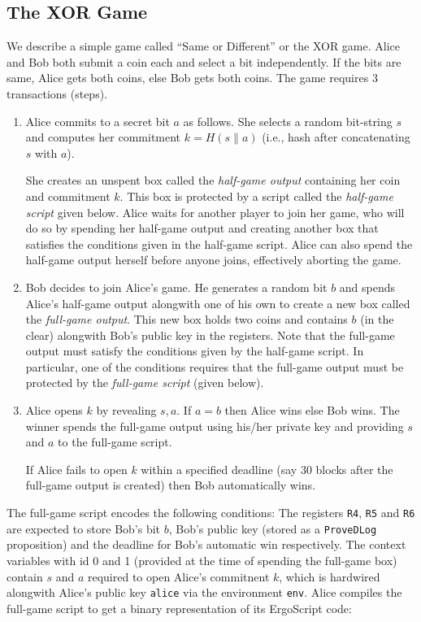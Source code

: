 \documentclass[11pt]{article}
\newcommand{\langname}{ErgoScript\xspace}
\begin{document}
\subsection{The XOR Game}

We describe a simple game called ``Same or Different'' or the XOR game. Alice and Bob both submit a coin each and select a bit independently. If the bits are same, Alice gets both coins, else Bob gets both coins. The game requires 3 transactions (steps). 
\begin{enumerate}
	\item Alice commits to a secret bit $a$ as follows. She selects a random bit-string $s$ and computes her commitment $k = H(s\|a)$ (i.e., hash after concatenating $s$ with $a$).
	
	She creates an unspent box called the {\em half-game output} containing her coin and commitment $k$. This box is protected by a script called the {\em half-game script}  given below. Alice waits for another player to join her game, who will do so by spending her half-game output and creating another box that satisfies the conditions given in the half-game script. Alice can also spend the half-game output herself before anyone joins, effectively aborting the game. 
	
	\item Bob decides to join Alice's game. He generates a random bit $b$ and spends Alice's half-game output alongwith one of his own to create a new box called the {\em full-game output}. This new box  holds two coins and contains $b$ (in the clear) alongwith Bob's public key in the registers. 
	Note that the full-game output must satisfy the conditions given by the half-game script. In particular, one of the conditions requires that the full-game output must be protected by the {\em full-game script} (given below).
	\item Alice opens $k$ by revealing $s, a$. If $a = b$ then Alice wins else Bob wins. The winner spends the full-game output using his/her private key and providing $s$ and $a$ to the full-game script.

	If Alice fails to open $k$ within a specified deadline (say 30 blocks after the full-game output is created) then Bob automatically wins. 
\end{enumerate}

The full-game script encodes the following conditions: The registers \texttt{R4}, \texttt{R5} and \texttt{R6} are expected to store Bob's bit $b$, Bob's public key (stored as a \texttt{ProveDLog} proposition) and the deadline for Bob's automatic win respectively. The context variables with id 0 and 1 (provided at the time of spending the full-game box) contain $s$ and $a$ required to open Alice's commitnent $k$, which is hardwired alongwith Alice's public key \texttt{alice} via the environment \texttt{env}. 
Alice compiles the full-game script to get a binary representation of its \langname code: 
\end{document}

